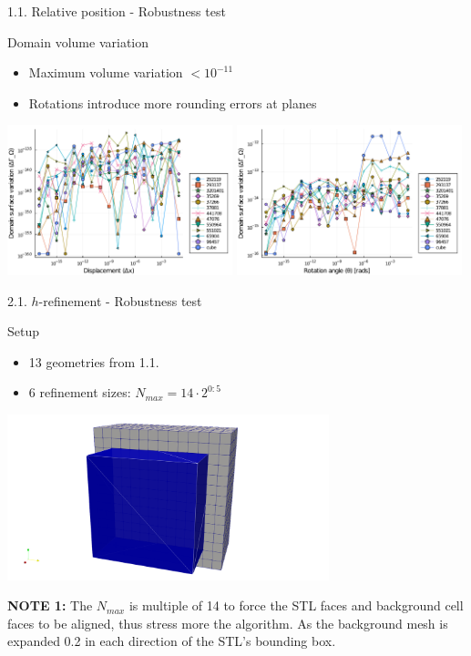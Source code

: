 \documentclass{beamer}
\begin{document}
\begin{frame}{1.1. Relative position - Robustness test}

  \begin{block}{Domain volume variation}
  \begin{itemize}
    \item
      Maximum volume variation $< 10^{-11}$
    \item
      Rotations introduce more rounding errors at planes
  \end{itemize}
  \end{block}

  \includegraphics[width=0.49\textwidth]{../analysis/plots/x_displacement_y_domain_surface}
  \includegraphics[width=0.49\textwidth]{../analysis/plots/x_rotation_y_domain_surface}
\end{frame}


\begin{frame}{2.1. $h$-refinement - Robustness test}
  \begin{block}{Setup}
    \begin{itemize}
      \item
        13 geometries from 1.1.
      \item
        6 refinement sizes: $N_{max} = 14 \cdot 2^{0:5}$
    \end{itemize}
  \end{block}

  \includegraphics[width=0.7\textwidth]{cube_bb}

  \textbf{NOTE 1:} The $N_{max}$ is multiple of 14 to force the STL faces and background cell faces to be aligned, thus stress more the algorithm. As the background mesh is expanded 0.2 in each direction of the STL's bounding box.
\end{frame}
\end{document}
